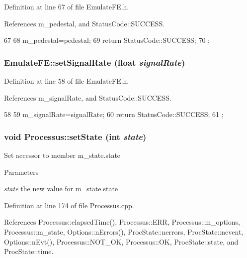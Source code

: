 Definition at line 67 of file EmulateFE.h.

References m\_\-pedestal, and StatusCode::SUCCESS.


\begin{DoxyCode}
67                                          {
68     m_pedestal=pedestal;
69     return StatusCode::SUCCESS;
70   };
\end{DoxyCode}
\hypertarget{classEmulateFE_ad785934c216c213e504f3db72b53354f}{
\subsubsection[{setSignalRate}]{ EmulateFE::setSignalRate (float {\em signalRate})}}
\label{classEmulateFE_ad785934c216c213e504f3db72b53354f}


Definition at line 58 of file EmulateFE.h.

References m\_\-signalRate, and StatusCode::SUCCESS.


\begin{DoxyCode}
58                                              {
59     m_signalRate=signalRate;
60     return StatusCode::SUCCESS;
61   };
\end{DoxyCode}
\hypertarget{classProcessus_ad38cde0f1bcefa00b068e7947b8af927}{
\subsubsection[{setState}]{\setlength{\rightskip}{0pt plus 5cm}void Processus::setState (int {\em state})}}
\label{classProcessus_ad38cde0f1bcefa00b068e7947b8af927}
Set accessor to member m\_\-state.state 
\begin{DoxyParams}{Parameters}
\item[{\em state}]the new value for m\_\-state.state \end{DoxyParams}


Definition at line 174 of file Processus.cpp.

References Processus::elapsedTime(), Processus::ERR, Processus::m\_\-options, Processus::m\_\-state, Options::nErrors(), ProcState::nerrors, ProcState::nevent, Options::nEvt(), Processus::NOT\_\-OK, Processus::OK, ProcState::state, and ProcState::time.

